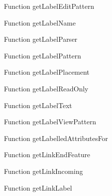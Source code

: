\begin{minipage}[b]{0.5\textwidth}
\centering
{}
Function getLabelEditPattern
\end{minipage}
\begin{minipage}[b]{0.5\textwidth}
\centering
{}
Function getLabelName
\end{minipage}
\begin{minipage}[b]{0.5\textwidth}
\centering
{}
Function getLabelParser
\end{minipage}
\begin{minipage}[b]{0.5\textwidth}
\centering
{}
Function getLabelPattern
\end{minipage}
\begin{minipage}[b]{0.5\textwidth}
\centering
{}
Function getLabelPlacement
\end{minipage}
\begin{minipage}[b]{0.5\textwidth}
\centering
{}
Function getLabelReadOnly
\end{minipage}
\begin{minipage}[b]{0.5\textwidth}
\centering
{}
Function getLabelText
\end{minipage}
\begin{minipage}[b]{0.5\textwidth}
\centering
{}
Function getLabelViewPattern
\end{minipage}
\begin{minipage}[b]{0.5\textwidth}
\centering
{}
Function getLabelledAttributesFor
\end{minipage}
\begin{minipage}[b]{0.5\textwidth}
\centering
{}
Function getLinkEndFeature
\end{minipage}
\begin{minipage}[b]{0.5\textwidth}
\centering
{}
Function getLinkIncoming
\end{minipage}
\begin{minipage}[b]{0.5\textwidth}
\centering
{}
Function getLinkLabel
\end{minipage}
